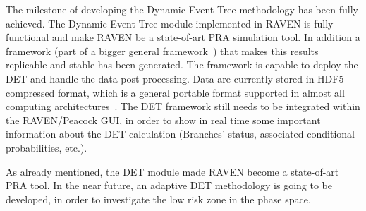 \label{sec:conclusions}
The milestone of developing the Dynamic Event Tree methodology has been fully achieved. The Dynamic Event Tree module implemented in RAVEN is fully functional and make RAVEN be a state-of-art PRA simulation tool. In addition a framework (part of a bigger general framework~\cite{RAVENFY13}) that makes this results replicable and stable has been generated. The framework is capable to deploy the DET and handle the data post processing. Data are currently stored in HDF5 compressed format, which is a general portable format supported in almost all computing architectures~\cite{HDF5}. 
The DET framework still needs to be integrated within the RAVEN/Peacock GUI, in order to show in real time some important information about the DET calculation (Branches' status, associated conditional probabilities, etc.).

As already mentioned, the DET module made RAVEN become a state-of-art PRA tool. In the near future, an adaptive DET methodology is going to be developed, in order to investigate the low risk zone in the phase space.
  
